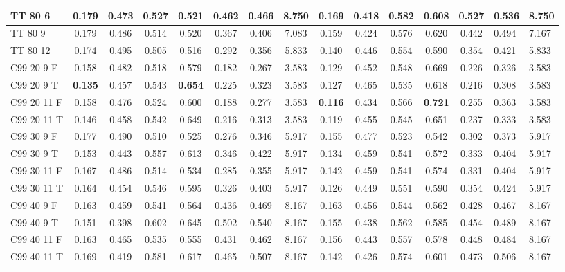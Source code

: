 \documentclass{article}
\begin{document}
\begin{longtable}[c]{|l|c|c|c|c|c|c||c|c|c|c|c|c|}
TT 80  6 & 0.179 & 0.473 & 0.527 & 0.521 & 0.462 & 0.466 & 8.750 & 0.169 & 0.418 & 0.582 & 0.608 & 0.527 & 0.536 & 8.750\\ \hline
TT 80  9 & 0.179 & 0.486 & 0.514 & 0.520 & 0.367 & 0.406 & 7.083 & 0.159 & 0.424 & 0.576 & 0.620 & 0.442 & 0.494 & 7.167\\ \hline
TT 80 12 & 0.174 & 0.495 & 0.505 & 0.516 & 0.292 & 0.356 & 5.833 & 0.140 & 0.446 & 0.554 & 0.590 & 0.354 & 0.421 & 5.833\\ \hline\hline
C99 20  9 F & 0.158 & 0.482 & 0.518 & 0.579 & 0.182 & 0.267 & 3.583 & 0.129 & 0.452 & 0.548 & 0.669 & 0.226 & 0.326 & 3.583\\ \hline
C99 20  9 T & \textbf{0.135} & 0.457 & 0.543 & \textbf{0.654} & 0.225 & 0.323 & 3.583 & 0.127 & 0.465 & 0.535 & 0.618 & 0.216 & 0.308 & 3.583\\ \hline
C99 20 11 F & 0.158 & 0.476 & 0.524 & 0.600 & 0.188 & 0.277 & 3.583 & \textbf{0.116} & 0.434 & 0.566 & \textbf{0.721} & 0.255 & 0.363 & 3.583\\ \hline
C99 20 11 T & 0.146 & 0.458 & 0.542 & 0.649 & 0.216 & 0.313 & 3.583 & 0.119 & 0.455 & 0.545 & 0.651 & 0.237 & 0.333 & 3.583\\ \hline
C99 30  9 F & 0.177 & 0.490 & 0.510 & 0.525 & 0.276 & 0.346 & 5.917 & 0.155 & 0.477 & 0.523 & 0.542 & 0.302 & 0.373 & 5.917\\ \hline
C99 30  9 T & 0.153 & 0.443 & 0.557 & 0.613 & 0.346 & 0.422 & 5.917 & 0.134 & 0.459 & 0.541 & 0.572 & 0.333 & 0.404 & 5.917\\ \hline
C99 30 11 F & 0.167 & 0.486 & 0.514 & 0.534 & 0.285 & 0.355 & 5.917 & 0.142 & 0.459 & 0.541 & 0.574 & 0.331 & 0.404 & 5.917\\ \hline
C99 30 11 T & 0.164 & 0.454 & 0.546 & 0.595 & 0.326 & 0.403 & 5.917 & 0.126 & 0.449 & 0.551 & 0.590 & 0.354 & 0.424 & 5.917\\ \hline
C99 40  9 F & 0.163 & 0.459 & 0.541 & 0.564 & 0.436 & 0.469 & 8.167 & 0.163 & 0.456 & 0.544 & 0.562 & 0.428 & 0.467 & 8.167\\ \hline
C99 40  9 T & 0.151 & 0.398 & 0.602 & 0.645 & 0.502 & 0.540 & 8.167 & 0.155 & 0.438 & 0.562 & 0.585 & 0.454 & 0.489 & 8.167\\ \hline
C99 40 11 F & 0.163 & 0.465 & 0.535 & 0.555 & 0.431 & 0.462 & 8.167 & 0.156 & 0.443 & 0.557 & 0.578 & 0.448 & 0.484 & 8.167\\ \hline
C99 40 11 T & 0.169 & 0.419 & 0.581 & 0.617 & 0.465 & 0.507 & 8.167 & 0.142 & 0.426 & 0.574 & 0.601 & 0.473 & 0.506 & 8.167\\ \hline

\end{longtable}
\end{document}
